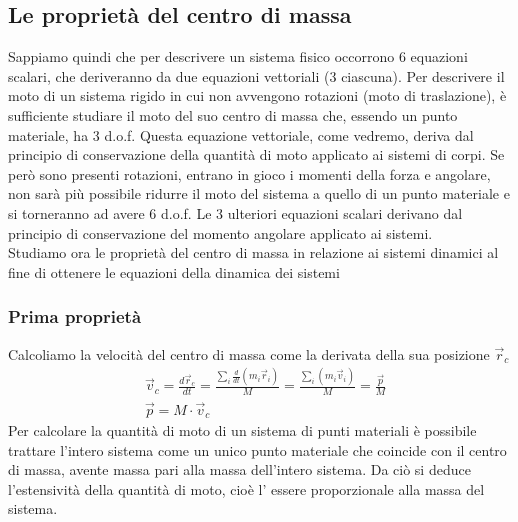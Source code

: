 \subsection{Le proprietà del centro di massa}
Sappiamo quindi che per descrivere un sistema fisico occorrono 6 equazioni scalari, che deriveranno da due equazioni vettoriali (3 ciascuna). Per descrivere il moto di un sistema rigido in cui non avvengono rotazioni (moto di traslazione), è sufficiente studiare il moto del suo centro di massa che, essendo un punto materiale, ha 3 d.o.f. Questa equazione vettoriale, come vedremo, deriva dal principio di conservazione della quantità di moto applicato ai sistemi di corpi. Se però sono presenti rotazioni, entrano in gioco i momenti della forza e angolare, non sarà più possibile ridurre il moto del sistema a quello di un punto materiale e si torneranno ad avere 6 d.o.f. Le 3 ulteriori equazioni scalari derivano dal principio di conservazione del momento angolare applicato ai sistemi.\\
Studiamo ora le proprietà del centro di massa in relazione ai sistemi dinamici al fine di ottenere le equazioni della dinamica dei sistemi
\subsubsection{Prima proprietà}
Calcoliamo la velocità del centro di massa come la derivata della sua posizione $\vec{r}_c$
\begin{align*}
&\vec{v}_c = \frac{d\vec{r}_c}{dt}=\frac{\sum_{i}\frac{d}{dt}(m_i \vec{r}_i)}{M}=\frac{\sum_{i}(m_i \vec{v}_i)}{M}=\frac{\vec{p}}{M}\\
&\vec{p} = M \cdot \vec{v}_c
\end{align*}
Per calcolare la quantità di moto di un sistema di punti materiali è possibile trattare l'intero sistema come un unico punto materiale che coincide con il centro di massa, avente massa pari alla massa dell'intero sistema. Da ciò si deduce l'estensività della quantità di moto, cioè l' essere proporzionale alla massa del sistema.
